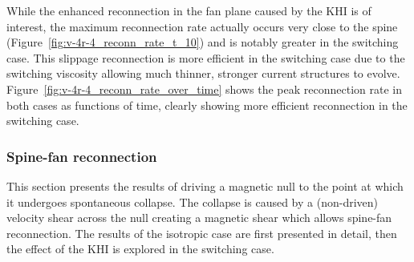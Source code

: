 
While the enhanced reconnection in the fan plane caused by the KHI is of interest, the maximum reconnection rate actually occurs very close to the spine (Figure~\ref{fig:v-4r-4_reconn_rate_t_10}) and is notably greater in the switching case. This slippage reconnection is more efficient in the switching case due to the switching viscosity allowing much thinner, stronger current structures to evolve. Figure~\ref{fig:v-4r-4_reconn_rate_over_time} shows the peak reconnection rate in both cases as functions of time, clearly showing more efficient reconnection in the switching case.

\subsubsection{Spine-fan reconnection}

This section presents the results of driving a magnetic null to the point at which it undergoes spontaneous collapse. The collapse is caused by a (non-driven) velocity shear across the null creating a magnetic shear which allows spine-fan reconnection. The results of the isotropic case are first presented in detail, then the effect of the KHI is explored in the switching case.

